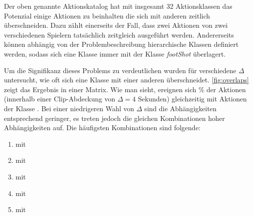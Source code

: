 Der oben genannte Aktionskatalog hat mit insgesamt 32 Aktionsklassen das Potenzial einige Aktionen zu beinhalten die sich mit anderen zeitlich überschneiden.
Dazu zählt einerseits der Fall, dass zwei Aktionen von zwei verschiedenen Spielern tatsächlich zeitgleich ausgeführt werden.
Andererseits können abhängig von der Problembeschreibung \zB hierarchische Klassen definiert werden, sodass sich eine Klasse  immer mit der Klasse \emph{footShot} überlagert.

Um die Signifikanz dieses Problems zu verdeutlichen wurden für verschiedene $\Delta$ untersucht, wie oft sich eine Klasse mit einer anderen überschneidet.
\autoref{fig:overlaps} zeigt das Ergebnis in einer Matrix.
Wie man sieht, ereignen sich  \% der Aktionen  (innerhalb einer Clip-Abdeckung von $\Delta=4$ Sekunden) gleichzeitig mit Aktionen der Klasse .
Bei einer niedrigeren Wahl von $\Delta$ sind die Abhängigkeiten entsprechend geringer, es treten jedoch die gleichen Kombinationen hoher Abhängigkeiten auf.
Die häufigsten Kombinationen sind folgende:

\begin{enumerate}
    \item {} mit 
    \item {} mit 
    \item {} mit 
    \item {} mit 
    \item {} mit 
\end{enumerate}


